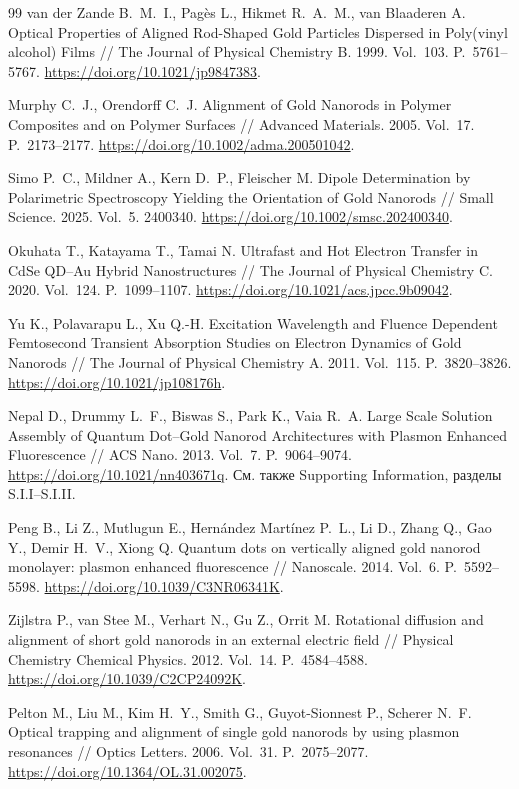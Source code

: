 \begin{thebibliography}{99}
van der Zande B.~M.~I., Pag\`es L., Hikmet R.~A.~M., van Blaaderen A.
Optical Properties of Aligned Rod-Shaped Gold Particles Dispersed
in Poly(vinyl alcohol) Films
// The Journal of Physical Chemistry B. 1999. Vol.~103. P.~5761--5767.
\url{https://doi.org/10.1021/jp9847383}.

Murphy C.~J., Orendorff C.~J.
Alignment of Gold Nanorods in Polymer Composites and on Polymer Surfaces
// Advanced Materials. 2005. Vol.~17. P.~2173--2177.
\url{https://doi.org/10.1002/adma.200501042}.

Simo P.~C., Mildner A., Kern D.~P., Fleischer M.
Dipole Determination by Polarimetric Spectroscopy Yielding the
Orientation of Gold Nanorods
// Small Science. 2025. Vol.~5. 2400340.
\url{https://doi.org/10.1002/smsc.202400340}.

Okuhata T., Katayama T., Tamai N.
Ultrafast and Hot Electron Transfer in CdSe QD--Au Hybrid Nanostructures
// The Journal of Physical Chemistry C. 2020. Vol.~124. P.~1099--1107.
\url{https://doi.org/10.1021/acs.jpcc.9b09042}.

Yu K., Polavarapu L., Xu Q.-H.
Excitation Wavelength and Fluence Dependent Femtosecond Transient
Absorption Studies on Electron Dynamics of Gold Nanorods
// The Journal of Physical Chemistry A. 2011. Vol.~115. P.~3820--3826.
\url{https://doi.org/10.1021/jp108176h}.

Nepal D., Drummy L.~F., Biswas S., Park K., Vaia R.~A.
Large Scale Solution Assembly of Quantum Dot--Gold Nanorod Architectures
with Plasmon Enhanced Fluorescence
// ACS Nano. 2013. Vol.~7. P.~9064--9074.
\url{https://doi.org/10.1021/nn403671q}.
См. также Supporting Information, разделы S.I.I--S.I.II.

Peng B., Li Z., Mutlugun E., Hern\'andez Mart\'inez P.~L., Li D.,
Zhang Q., Gao Y., Demir H.~V., Xiong Q.
Quantum dots on vertically aligned gold nanorod monolayer:
plasmon enhanced fluorescence
// Nanoscale. 2014. Vol.~6. P.~5592--5598.
\url{https://doi.org/10.1039/C3NR06341K}.

Zijlstra P., van Stee M., Verhart N., Gu Z., Orrit M.
Rotational diffusion and alignment of short gold nanorods
in an external electric field
// Physical Chemistry Chemical Physics. 2012. Vol.~14. P.~4584--4588.
\url{https://doi.org/10.1039/C2CP24092K}.

Pelton M., Liu M., Kim H.~Y., Smith G., Guyot-Sionnest P., Scherer N.~F.
Optical trapping and alignment of single gold nanorods
by using plasmon resonances
// Optics Letters. 2006. Vol.~31. P.~2075--2077.
\url{https://doi.org/10.1364/OL.31.002075}.

\end{thebibliography}
